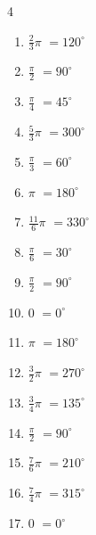 \begin{multicols}{4}
\begin{enumerate}
  \item $\displaystyle \frac{2}{3}\pi$
        $\displaystyle =120^{\circ}$

  \item $\displaystyle \frac{\pi}{2}$
        $\displaystyle =90^{\circ}$

  \item $\displaystyle \frac{\pi}{4}$
        $\displaystyle =45^{\circ}$

  \item $\displaystyle \frac{5}{3}\pi$
        $\displaystyle =300^{\circ}$

  \item $\displaystyle \frac{\pi}{3}$
        $\displaystyle =60^{\circ}$

  \item $\displaystyle \pi$
        $\displaystyle =180^{\circ}$

  \item $\displaystyle \frac{11}{6}\pi$
        $\displaystyle =330^{\circ}$

  \item $\displaystyle \frac{\pi}{6}$
        $\displaystyle =30^{\circ}$

  \item $\displaystyle \frac{\pi}{2}$
        $\displaystyle =90^{\circ}$

  \item $\displaystyle 0$
        $\displaystyle =0^{\circ}$

  \item $\displaystyle \pi$
        $\displaystyle =180^{\circ}$

  \item $\displaystyle \frac{3}{2}\pi$
        $\displaystyle =270^{\circ}$

  \item $\displaystyle \frac{3}{4}\pi$
        $\displaystyle =135^{\circ}$

  \item $\displaystyle \frac{\pi}{2}$
        $\displaystyle =90^{\circ}$

  \item $\displaystyle \frac{7}{6}\pi$
        $\displaystyle =210^{\circ}$

  \item $\displaystyle \frac{7}{4}\pi$
        $\displaystyle =315^{\circ}$

  \item $\displaystyle 0$
        $\displaystyle =0^{\circ}$


\end{enumerate}
\end{multicols}
